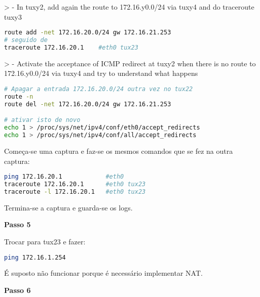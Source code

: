> - In tuxy2, add again the route to 172.16.y0.0/24 via tuxy4 and  do  traceroute tuxy3

\begin{lstlisting}[language=bash]
route add -net 172.16.20.0/24 gw 172.16.21.253
# seguido de
traceroute 172.16.20.1    #eth0 tux23
\end{lstlisting}

> - Activate the acceptance of ICMP redirect at tuxy2 when there is no route to 172.16.y0.0/24 via tuxy4 and try to understand what happens


\begin{lstlisting}[language=bash]
# Apagar a entrada 172.16.20.0/24 outra vez no tux22
route -n
route del -net 172.16.20.0/24 gw 172.16.21.253

# ativar isto de novo
echo 1 > /proc/sys/net/ipv4/conf/eth0/accept_redirects 
echo 1 > /proc/sys/net/ipv4/conf/all/accept_redirects
\end{lstlisting}

Começa-se uma captura e faz-se os mesmos comandos que se fez na outra captura:
\begin{lstlisting}[language=bash]
ping 172.16.20.1            #eth0 
traceroute 172.16.20.1      #eth0 tux23
traceroute -l 172.16.20.1   #eth0 tux23
\end{lstlisting}
Termina-se a captura e guarda-se os logs.

\textbf{Passo 5}

Trocar para tux23 e fazer:
\begin{lstlisting}[language=bash]
ping 172.16.1.254
\end{lstlisting}
É suposto não funcionar porque é necessário implementar NAT.

\textbf{Passo 6}


